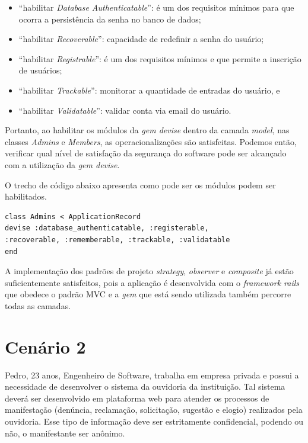 \begin{itemize}
	\item “habilitar \textit{Database Authenticatable}”: é um dos requisitos mínimos para que ocorra a persistência da senha no banco de dados;
	\item “habilitar \textit{Recoverable}”: capacidade de redefinir a senha do usuário;
	\item “habilitar \textit{Registrable}”: é um dos requisitos mínimos e que permite a inscrição de usuários; 
	\item “habilitar \textit{Trackable}”: monitorar a quantidade de entradas do usuário, e 
	\item “habilitar \textit{Validatable}”: validar conta via email do usuário. 
\end{itemize}

Portanto, ao habilitar os módulos da \textit{gem devise} dentro da camada \textit{model}, nas classes \textit{Admins} e \textit{Members}, as operacionalizações são satisfeitas. Podemos então, verificar qual nível de satisfação da segurança do software pode ser alcançado com a utilização da \textit{gem devise}. 

O trecho de código abaixo apresenta como pode ser os módulos podem ser habilitados.  
 
\begin{lstlisting} 
class Admins < ApplicationRecord
devise :database_authenticatable, :registerable,
:recoverable, :rememberable, :trackable, :validatable
end 
\end{lstlisting} 

A implementação dos padrões de projeto \textit{strategy}, \textit{observer} e \textit{composite} já estão suficientemente satisfeitos, pois a aplicação é desenvolvida com o \textit{framework rails} que obedece o padrão MVC e a \textit{gem} que está sendo utilizada também percorre todas as camadas. 

\section{Cenário 2}
\label{subsec:persona2}

Pedro, 23 anos, Engenheiro de Software, trabalha em empresa privada e possui a necessidade de desenvolver o sistema da ouvidoria da instituição. Tal sistema deverá ser desenvolvido em plataforma web para atender os processos de manifestação (denúncia, reclamação, solicitação, sugestão e elogio) realizados pela ouvidoria. Esse tipo de informação deve ser estritamente confidencial, podendo ou não, o manifestante ser anônimo.  

